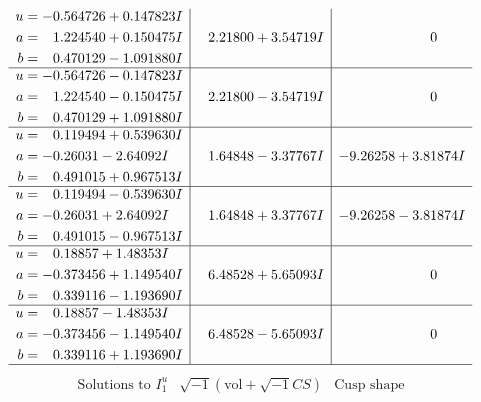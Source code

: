 \documentclass[1p]{elsarticle_modified}
\theoremstyle{definition}
\newcommand{\I}{\sqrt{-1}}
\begin{document}
$$\begin{array}{c|c|c}
\begin{aligned}
u &= -0.564726 + 0.147823 I \\
a &= \phantom{-}1.224540 + 0.150475 I \\
b &= \phantom{-}0.470129 - 1.091880 I\end{aligned}
 & \phantom{-}2.21800 + 3.54719 I & \phantom{-0.000000 } 0 \\ \hline\begin{aligned}
u &= -0.564726 - 0.147823 I \\
a &= \phantom{-}1.224540 - 0.150475 I \\
b &= \phantom{-}0.470129 + 1.091880 I\end{aligned}
 & \phantom{-}2.21800 - 3.54719 I & \phantom{-0.000000 } 0 \\ \hline\begin{aligned}
u &= \phantom{-}0.119494 + 0.539630 I \\
a &= -0.26031 - 2.64092 I \\
b &= \phantom{-}0.491015 + 0.967513 I\end{aligned}
 & \phantom{-}1.64848 - 3.37767 I & -9.26258 + 3.81874 I \\ \hline\begin{aligned}
u &= \phantom{-}0.119494 - 0.539630 I \\
a &= -0.26031 + 2.64092 I \\
b &= \phantom{-}0.491015 - 0.967513 I\end{aligned}
 & \phantom{-}1.64848 + 3.37767 I & -9.26258 - 3.81874 I \\ \hline\begin{aligned}
u &= \phantom{-}0.18857 + 1.48353 I \\
a &= -0.373456 + 1.149540 I \\
b &= \phantom{-}0.339116 - 1.193690 I\end{aligned}
 & \phantom{-}6.48528 + 5.65093 I & \phantom{-0.000000 } 0 \\ \hline\begin{aligned}
u &= \phantom{-}0.18857 - 1.48353 I \\
a &= -0.373456 - 1.149540 I \\
b &= \phantom{-}0.339116 + 1.193690 I\end{aligned}
 & \phantom{-}6.48528 - 5.65093 I & \phantom{-0.000000 } 0\\
 \hline 
 \end{array}$$\newpage$$\begin{array}{c|c|c}  
\text{Solutions to }I^u_{1}& \I (\text{vol} + \sqrt{-1}CS) & \text{Cusp shape}\\

\end{array}$$
\end{document}
